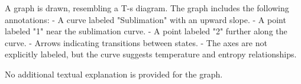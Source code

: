 A graph is drawn, resembling a T-s diagram. The graph includes the following annotations:  
- A curve labeled "Sublimation" with an upward slope.  
- A point labeled "1" near the sublimation curve.  
- A point labeled "2" further along the curve.  
- Arrows indicating transitions between states.  
- The axes are not explicitly labeled, but the curve suggests temperature and entropy relationships.  

No additional textual explanation is provided for the graph.
